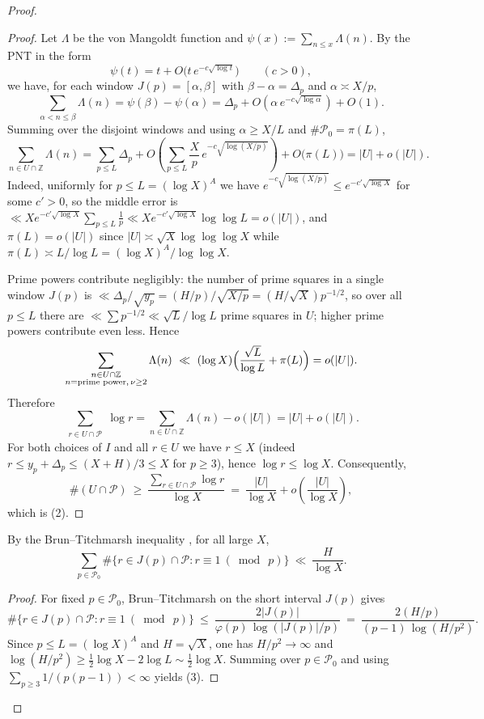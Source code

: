 \begin{proof}
\begin{proof}
Let $\Lambda$ be the von Mangoldt function and $\psi(x):=\sum_{n\le x}\Lambda(n)$. By the PNT in the form
$$
\psi(t)=t+O\bigl(t\,e^{-c\sqrt{\log t}}\bigr)\qquad (c>0),
$$
we have, for each window $J(p)=[\alpha,\beta]$ with $\beta-\alpha=\Delta_p$ and $\alpha\asymp X/p$,
$$
\sum_{\alpha<n\le\beta}\Lambda(n)
= \psi(\beta)-\psi(\alpha)
= \Delta_p + O\!\left(\alpha\,e^{-c\sqrt{\log \alpha}}\right) + O(1).
$$
Summing over the disjoint windows and using $\alpha\ge X/L$ and $\#\mathcal P_0=\pi(L)$,
$$
\sum_{n\in U\cap\mathbb Z}\Lambda(n)
= \sum_{p\le L}\Delta_p + O\!\left(\sum_{p\le L}\frac{X}{p}\,e^{-c\sqrt{\log(X/p)}}\right)+O\bigl(\pi(L)\bigr)
= |U| + o(|U|).
$$
Indeed, uniformly for $p\le L=(\log X)^A$ we have $e^{-c\sqrt{\log(X/p)}}\le e^{-c'\sqrt{\log X}}$ for some $c'>0$, so the middle error is $\ll X e^{-c'\sqrt{\log X}}\sum_{p\le L}\tfrac1p\ll X e^{-c'\sqrt{\log X}}\log\log L=o(|U|)$, and $\pi(L)=o(|U|)$ since $|U|\asymp \sqrt X\log\log\log X$ while $\pi(L)\asymp L/\log L=(\log X)^A/\log\log X$.

Prime powers contribute negligibly: the number of prime squares in a single window $J(p)$ is $\ll \Delta_p/\sqrt{y_p}= (H/p)/\sqrt{X/p}=(H/\sqrt X)p^{-1/2}$, so over all $p\le L$ there are $\ll \sum p^{-1/2}\ll \sqrt L/\log L$ prime squares in $U$; higher prime powers contribute even less. Hence
$$
\sum_{\substack{n\in U\cap\mathbb Z\\ n=\text{prime power},\,\nu\ge2}}\Lambda(n)\ \ll\ (\log X)\Bigl(\frac{\sqrt L}{\log L}+\pi(L)\Bigr)
= o(|U|).
$$
Therefore
$$
\sum_{\substack{r\in U\cap\mathcal P}}\log r
= \sum_{n\in U\cap\mathbb Z}\Lambda(n) - o(|U|)
= |U|+o(|U|).
$$
For both choices of $I$ and all $r\in U$ we have $r\le X$ (indeed $r\le y_p+\Delta_p\le (X+H)/3\le X$ for $p\ge3$), hence $\log r\le\log X$. Consequently,
$$
\#(U\cap\mathcal P)\ \ge\ \frac{\sum_{r\in U\cap\mathcal P}\log r}{\log X}
\ =\ \frac{|U|}{\log X}+o\!\left(\frac{|U|}{\log X}\right),
$$
which is (2).
\end{proof}

\begin{lemma}\label{lem:exclude-one-mod-p}
By the Brun--Titchmarsh inequality \cite{MV2007}, for all large $X$,
$$
\sum_{p\in\mathcal P_0}\#\{r\in J(p)\cap\mathcal P: r\equiv1\ (\bmod\ p)\}
\ \ll\ \frac{H}{\log X}.\tag{3}
$$
\end{lemma}

\begin{proof}
For fixed $p\in\mathcal P_0$, Brun--Titchmarsh on the short interval $J(p)$ gives
$$
\#\{r\in J(p)\cap\mathcal P: r\equiv1\ (\bmod\ p)\}
\ \le\ \frac{2|J(p)|}{\varphi(p)\,\log(|J(p)|/p)}
\ =\ \frac{2(H/p)}{(p-1)\,\log(H/p^2)}.
$$
Since $p\le L=(\log X)^A$ and $H=\sqrt X$, one has $H/p^2\to\infty$ and $\log(H/p^2)\ge \tfrac12\log X-2\log L\sim \tfrac12\log X$. Summing over $p\in\mathcal P_0$ and using $\sum_{p\ge3}1/(p(p-1))<\infty$ yields (3).
\end{proof}


\end{proof}
